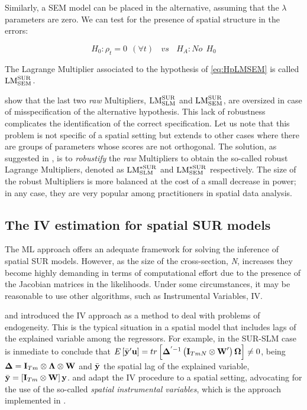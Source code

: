 \documentclass[article]{jss}
\begin{document}
Similarly, a SEM model can be placed in the alternative, assuming that the \(\lambda\) parameters are zero. We can test for the presence of spatial structure in the errors:

\begin{equation}
H_0 :\rho_t =0 \ \ (\forall t)  \ \ \ \ vs  \ \  \ \ H_A: No  \ \ H_0
\label{eq:HpLMSEM}
\end{equation}

The Lagrange Multiplier associated to the hypothesis of \eqref{eq:HpLMSEM} is called \({\rm LM}_{\rm SEM}^{\rm SUR}\).

\citet{Bera1993} show that the last two \emph{raw} Multipliers, \({\rm LM}_{\rm SLM}^{\rm SUR}\) and \({\rm LM}_{\rm SEM}^{\rm SUR}\), are oversized in case of misspecification of the alternative hypothesis. This lack of robustness complicates the identification of the correct specification. Let us note that this problem is not specific of a spatial setting but extends to other cases where there are groups of parameters whose scores are not orthogonal. The solution, as suggested in \citet{Anselin1996}, is to \emph{robustify} the \emph{raw} Multipliers to obtain the so-called robust Lagrange Multipliers, denoted as \({\rm LM}_{\rm SLM}^{\rm *SUR}\) and \({\rm LM}_{\rm SEM}^{\rm *SUR}\) respectively. The size of the robust Multipliers is more balanced at the cost of a small decrease in power; in any case, they are very popular among practitioners in spatial data analysis.

\hypertarget{the-iv-estimation-method-for-spatial-sur}{%
\subsection{The IV estimation for spatial SUR models}\label{the-iv-estimation-method-for-spatial-sur}}

The ML approach offers an adequate framework for solving the inference of spatial SUR models. However, as the size of the cross-section, \emph{N}, increases they become highly demanding in terms of computational effort due to the presence of the Jacobian matrices in the likelihoods. Under some circumstances, it may be reasonable to use other algorithms, such as Instrumental Variables, IV.

\citet{Durbin1954} and \citet{Sargan1958} introduced the IV approach as a method to deal with problems of endogeneity. This is the typical situation in a spatial model that includes lags of the explained variable among the regressors. For example, in the SUR-SLM case is inmediate to conclude that \(E\left[\bar{{\bf y}}' {\bf u}\right]=tr\left[{\boldsymbol \Delta}^{'-1} \left({\bf I}_{TmN} \otimes \textbf{W}' \right) {\boldsymbol \Omega} \right] \neq 0\), being \({\boldsymbol \Delta}={\bf I}_{Tm} \otimes {\boldsymbol \Lambda} \otimes {\bf W}\) and \(\bar{{\bf y}}\) the spatial lag of the explained variable, \(\bar{{\bf y}} = \left[{\bf I}_{Tm} \otimes {\bf W} \right] {\bf y}\). \citet{Kelejian1998} and \citet{Kelejian1999} adapt the IV procedure to a spatial setting, advocating for the use of the so-called \emph{spatial instrumental variables}, which is the approach implemented in .
\end{document}
